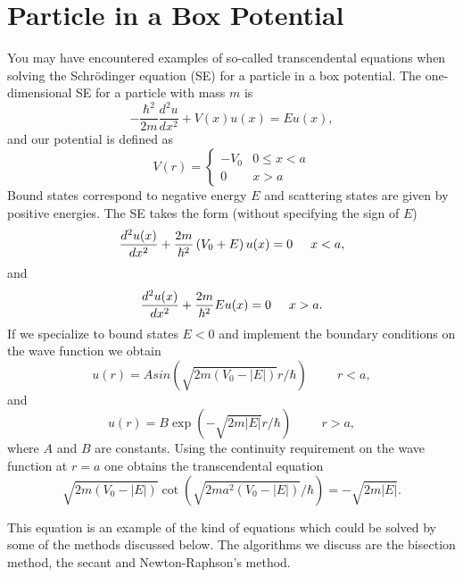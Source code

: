\section{Particle in a Box Potential}
You may have encountered examples of so-called transcendental equations when solving the 
Schr\"odinger equation (SE) for a particle in a box potential. 
The  one-dimensional 
SE for a  particle with mass $m$ is 
\begin{equation}
   -\frac{\hbar^2}{2m}\frac{d^2u}{dx^2}+V(x)u(x)=Eu(x),
\end{equation}
and our potential is defined as 
\begin{equation}
V(r)=\left\{ \begin{array}{cc} -V_0& 0 \le x < a \\
                                0  & x > a \end{array} \right.
\end{equation}
Bound states correspond to negative energy $E$ and scattering states
are given by positive energies.
The SE takes the form (without specifying the sign of $E$)
\begin{equation}
   \frac{d^2u(x)}{dx^2}+\frac{2m}{\hbar^2}\left(V_0+E\right)u(x)=0\hspace{0.5cm} x < a,
\end{equation}
and 
\begin{equation}
   \frac{d^2u(x)}{dx^2}+\frac{2m}{\hbar^2}Eu(x)=0\hspace{0.5cm} x > a.
\end{equation}
If we specialize to bound states $E< 0$ and 
implement the boundary conditions
on the wave function 
we obtain 
\begin{equation} 
   u(r)=Asin(\sqrt{2m(V_0-|E|)}r/\hbar) \hspace{1cm} r < a,
\end{equation}
and 
\begin{equation}
   u(r)=B\exp{(- \sqrt{2m|E|}r/\hbar)} \hspace{1cm} r > a,
\end{equation}
where $A$ and $B$ are constants. 
Using the continuity requirement on the wave function at $r=a$ 
one obtains the transcendental equation
\begin{equation}
   \sqrt{2m(V_0-|E|)}\cot{(\sqrt{2ma^2(V_0-|E|)}/\hbar)}=-\sqrt{2m|E|}. 
   \label{eq:onex}
\end{equation}

This equation is an example of the kind of equations which could be solved
by some of the methods discussed below. The algorithms we discuss are the bisection method,
the secant and Newton-Raphson's method.

